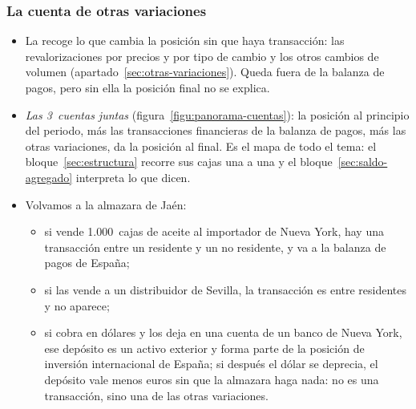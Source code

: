 \documentclass[11pt]{article}
\begin{document}
\subsubsection{La cuenta de otras variaciones}\label{sec:concepto-ov}

\begin{itemize}
\item La  recoge lo que cambia la posición sin que haya transacción: las revalorizaciones por precios y por tipo de cambio y los otros cambios de volumen (apartado~\ref{sec:otras-variaciones}). Queda fuera de la balanza de pagos, pero sin ella la posición final no se explica.

\item \emph{Las 3~cuentas juntas} (figura~\ref{figu:panorama-cuentas}): la posición al principio del periodo, más las transacciones financieras de la balanza de pagos, más las otras variaciones, da la posición al final. Es el mapa de todo el tema: el bloque~\ref{sec:estructura} recorre sus cajas una a una y el bloque~\ref{sec:saldo-agregado} interpreta lo que dicen.
\end{itemize}

\begin{infografia}[H]
\centering
\caption{Panorama de las cuentas internacionales: de la posición inicial a la final}\label{figu:panorama-cuentas}
\end{infografia}

\begin{itemize}
\item Volvamos a la almazara de Jaén:
  \begin{itemize}
  \item si vende 1.000~cajas de aceite al importador de Nueva York, hay una transacción entre un residente y un no residente, y va a la balanza de pagos de España;
  \item si las vende a un distribuidor de Sevilla, la transacción es entre residentes y no aparece;
  \item si cobra en dólares y los deja en una cuenta de un banco de Nueva York, ese depósito es un activo exterior y forma parte de la posición de inversión internacional de España; si después el dólar se deprecia, el depósito vale menos euros sin que la almazara haga nada: no es una transacción, sino una de las otras variaciones.
  \end{itemize}
\end{itemize}
\end{document}
